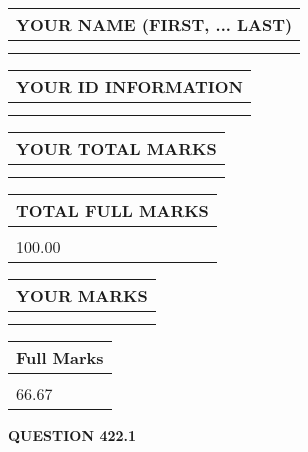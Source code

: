 \documentclass{ctexart}
\begin{document}
   
   
   
\newpage 
\setcounter{page}{ 
   422001 } 
   
   
   
   
\noindent\begin{tabular}{|l|}
\hline
YOUR NAME (FIRST, ... LAST)  \\
\hline
 \\ 
 \\ 
\hline
\end{tabular}
\hspace{0.05in} \begin{tabular}{|l|}
\hline
 YOUR   ID   INFORMATION  \\
\hline
 \\ 
 \\ 
\hline
\end{tabular}
   
   
\vspace{0.2in}\noindent\begin{tabular}{|l|}
\hline
YOUR TOTAL MARKS  \\
\hline
 \\ 
 \\ 
\hline
\end{tabular}
\hspace{0.05in} \begin{tabular}{|l|}
\hline
TOTAL FULL MARKS  \\
\hline
 \\ 
100.00 \\
\hline
\end{tabular}
   
   
 \vspace{0.2in}
 
 
 
 
   
   
  
\vspace{0.2in}
  
\noindent\begin{tabular}{|l|}
\hline
 YOUR MARKS  \\
\hline
 \\ 
 \\ 
\hline
\end{tabular}
\hspace{0.05in} \begin{tabular}{|l|}
\hline
 Full Marks  \\
\hline
 \\ 
66.67 \\
\hline
\end{tabular}
{\textbf{\Large{QUESTION
422.1 
}}}
  
\end{document}

